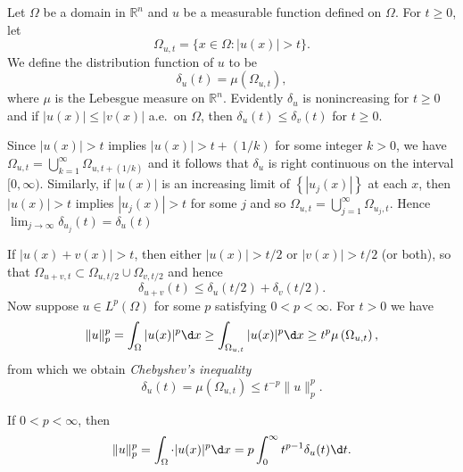 \begin{para}
  Let $\Omega$ be a domain in $\mathbb{R}^n$ and $u$ be a measurable function defined on $\Omega$.
  For $t \geq 0$, let
  \[\Omega_{u, t}=\{x \in \Omega:|u(x)|>t\}.\]
  We define the distribution function of $u$ to be
  \[\delta_u(t)=\mu\left(\Omega_{u, t}\right),\]
  where $\mu$ is the Lebesgue measure on $\mathbb{R}^n$. 
  Evidently $\delta_u$ is nonincreasing for $t \geq 0$ and if $|u(x)| \leq|v(x)|$ a.e.~on $\Omega$,
  then $\delta_u(t) \leq \delta_v(t)$ for $t \geq 0$.

  Since $|u(x)|>t$ implies $|u(x)|>t+(1 / k)$ for some integer $k>0$,
  we have $\Omega_{u, t}=\bigcup_{k=1}^{\infty} \Omega_{u, t+(1 / k)}$
  and it follows that $\delta_u$ is right continuous on the interval $[0, \infty)$.
  Similarly, if $|u(x)|$ is an increasing limit of $\left\{\left|u_j(x)\right|\right\}$ at each $x$,
  then $|u(x)|>t$ implies $\left|u_j(x)\right|>t$ for some $j$
  and so $\Omega_{u, t}=\bigcup_{j=1}^{\infty} \Omega_{u_j, t}$.
  Hence $\lim _{j \rightarrow \infty} \delta_{u_j}(t)=\delta_u(t)$

  If $|u(x)+v(x)|>t$, then either $|u(x)|>t / 2$ or $|v(x)|>t / 2$ (or both),
  so that $\Omega_{u+v, t} \subset \Omega_{u, t / 2} \cup \Omega_{v, t / 2}$ and hence
  \begin{equation}\label{eq:2.41}
    \delta_{u+v}(t) \leq \delta_u(t / 2)+\delta_v(t / 2).
  \end{equation}
  Now suppose $u \in L^p(\Omega)$ for some $p$ satisfying $0<p<\infty$. For $t>0$ we have
  \[\|u\|_p^p = \int_{\Omega}|u(x)|^p \d x \geq \int_{\Omega_{u, t}}|u(x)|^p \d x
    \geq t^p \mu\left(\Omega_{u, t}\right),\]
  from which we obtain \emph{Chebyshev's inequality}
  \begin{equation}\label{eq:2.42}
    \delta_u(t)=\mu\left(\Omega_{u, t}\right) \leq t^{-p}\|u\|_p^p.
  \end{equation}
\end{para}


\begin{lemma}
  If $0<p<\infty$, then
  \begin{equation}\label{eq:2.43}
    \|u\|_p^p=\int_{\Omega} \cdot|u(x)|^p \d x=p \int_0^{\infty} t^{p-1} \delta_u(t) \d t.  
  \end{equation}
\end{lemma}

